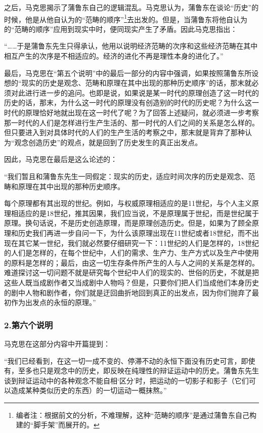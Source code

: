 \documentclass[a4paper,twoside,12pt,AutoFakeBold]{ctexart}
\begin{document}
之后，马克思揭示了蒲鲁东自己的逻辑混乱。马克思认为，蒲鲁东在谈论“历史”的时候，他是从他自认为的“范畴的顺序”\footnote{编者注：根据前文的分析，不难理解，这种“范畴的顺序”是通过蒲鲁东自己构建的“脚手架”而展开的。}去出发的。但是，当蒲鲁东将他自认为的“范畴的顺序”应用到现实中时，便同现实产生了矛盾。因此马克思指出：
\begin{adjustwidth}{2em}{2em}
    \qquad\fangsong
    “……于是蒲鲁东先生只得承认，他用以说明经济范畴的次序和这些经济范畴在其中相互产生的次序是不相适应的。经济的进化不再是理性本身的进化了。”
\end{adjustwidth}

最后，马克思在“第五个说明”中的最后一部分的内容中强调，如果按照蒲鲁东所设想的“现实的历史是观念、范畴和原理在其中出现的那种历史顺序”的话，那末就必须对此进行进一步的追问。也即是说，如果说是某一时代的原理创造了这一时代的历史的话，那末，为什么这一时代的原理没有创造别的时代的历史呢？为什么这一时代的原理恰好地就出现在这一时代了呢？为了回答上述疑问，就必须进一步考察那一时代的人们是怎样进行生产生活的、那一时代的人们之间的关系是怎么样的。但只要进入到对具体时代的人们的生产生活的考察之中，那末就是背弃了那种认为“观念创造历史”的观点，就是回到了历史发生的真正出发点。

因此，马克思在最后是这么论述的：
\begin{adjustwidth}{2em}{2em}
    \qquad\fangsong
“我们暂且和蒲鲁东先生一同假定：现实的历史，适应时间次序的历史是观念、范畴和原理在其中出现的那种历史顺序。

每个原理都有其出现的世纪。例如，与权威原理相适应的是11世纪，与个人主义原理相适应的是18世纪，推其因果，我们应当说，不是原理属于世纪，而是世纪属于原理。换句话说，不是历史创造原理，而是原理创造历史。但是，如果为了顾全原理和历史我们再进一步自问一下，为什么该原理出现在11世纪或者18世纪，而不出现在其它某一世纪，我们就必然要仔细研究一下：11世纪的人们是怎样的，18世纪的人们是怎样的，在每个世纪中，人们的需求、生产力、生产方式以及生产中使用的原料是怎样的；最后，由这一切生存条件所产生的人与人之间的关系是怎样的。难道探讨这一切问题不就是研究每个世纪中人们的现实的、世俗的历史，不就是把这些人既当成剧作者又当成剧中人物吗？但是，只要你们把人们当成他们本身历史的剧中人物和剧作者，你们就是迂回曲折地回到真正的出发点，因为你们抛弃了最初作为出发点的永恒的原理。”
\end{adjustwidth}

\subsubsection{2.第六个说明}
马克思在这部分内容中开篇提到：
\begin{adjustwidth}{2em}{2em}
    \qquad\fangsong
    “我们已经看到，在这一切一成不变的、停滞不动的永恒下面没有历史可言，即使有，至多也只是观念中的历史，即反映在纯理性的辩证运动中的历史。蒲鲁东先生谈到辩证运动中的各种观念不能自相‘区分’时，把运动的一切影子和影子（它们可以造成某种类似历史的东西）的一切运动一概抹熬。”
\end{adjustwidth}
\end{document}
